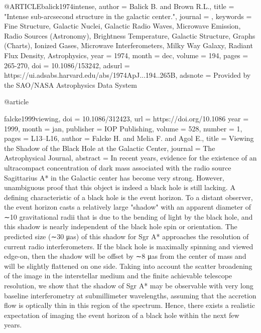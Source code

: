 @ARTICLE{balick1974intense,
       author = {{Balick B.} and {Brown R.L.}},
        title = "{Intense sub-arcsecond structure in the galactic center.}",
      journal = {\apj},
     keywords = {Fine Structure, Galactic Nuclei, Galactic Radio Waves, Microwave Emission, Radio Sources (Astronomy), Brightness Temperature, Galactic Structure, Graphs (Charts), Ionized Gases, Microwave Interferometers, Milky Way Galaxy, Radiant Flux Density, Astrophysics},
         year = 1974,
        month = dec,
       volume = {194},
        pages = {265-270},
          doi = {10.1086/153242},
       adsurl = {https://ui.adsabs.harvard.edu/abs/1974ApJ...194..265B},
      adsnote = {Provided by the SAO/NASA Astrophysics Data System}
}

@article{falcke1999viewing,
	doi = {10.1086/312423},
	url = {https://doi.org/10.1086%
	year = 1999,
	month = {jan},
	publisher = {{IOP} Publishing},
	volume = {528},
	number = {1},
	pages = {L13--L16},
	author = {{Falcke H.} and  {Melia F.} and {Agol E.}},
	title = {Viewing the Shadow of the Black Hole at the Galactic Center},
	journal = {The Astrophysical Journal},
	abstract = {In recent years, evidence for the existence of an ultracompact concentration of dark mass associated with the radio source Sagittarius A* in the Galactic center has become very strong. However, unambiguous proof that this object is indeed a black hole is still lacking. A defining characteristic of a black hole is the event horizon. To a distant observer, the event horizon casts a relatively large "shadow" with an apparent diameter of ∼10 gravitational radii that is due to the bending of light by the black hole, and this shadow is nearly independent of the black hole spin or orientation. The predicted size (∼30 μas) of this shadow for Sgr A* approaches the resolution of current radio interferometers. If the black hole is maximally spinning and viewed edge-on, then the shadow will be offset by ∼8 μas from the center of mass and will be slightly flattened on one side. Taking into account the scatter broadening of the image in the interstellar medium and the finite achievable telescope resolution, we show that the shadow of Sgr A* may be observable with very long baseline interferometry at submillimeter wavelengths, assuming that the accretion flow is optically thin in this region of the spectrum. Hence, there exists a realistic expectation of imaging the event horizon of a black hole within the next few years.}
}

}
